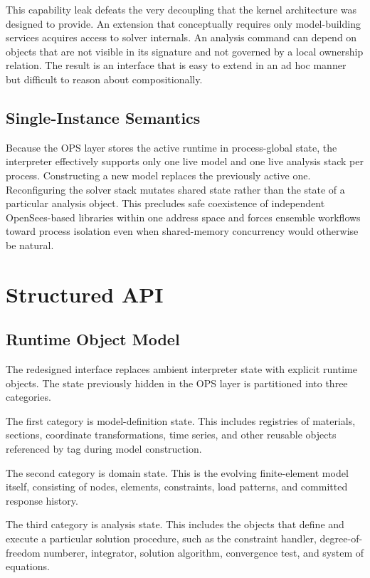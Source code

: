 This capability leak defeats the very decoupling that the kernel
architecture was designed to provide.
An extension that conceptually requires only model-building services
acquires access to solver internals.
An analysis command can depend on objects that are not visible in its
signature and not governed by a local ownership relation.
The result is an interface that is easy to extend in an ad hoc manner
but difficult to reason about compositionally.

\subsection{Single-Instance Semantics}

Because the OPS layer stores the active runtime in process-global state,
the interpreter effectively supports only one live model and one live
analysis stack per process.
Constructing a new model replaces the previously active one.
Reconfiguring the solver stack mutates shared state rather than the state
of a particular analysis object.
This precludes safe coexistence of independent OpenSees-based libraries
within one address space and forces ensemble workflows toward process
isolation even when shared-memory concurrency would otherwise be natural.

\section{Structured API}

\subsection{Runtime Object Model}

The redesigned interface replaces ambient interpreter state with explicit
runtime objects.
The state previously hidden in the OPS layer is partitioned into three
categories.

The first category is model-definition state.
This includes registries of materials, sections, coordinate
transformations, time series, and other reusable objects referenced by
tag during model construction.

The second category is domain state.
This is the evolving finite-element model itself, consisting of nodes,
elements, constraints, load patterns, and committed response history.

The third category is analysis state.
This includes the objects that define and execute a particular solution
procedure, such as the constraint handler, degree-of-freedom numberer,
integrator, solution algorithm, convergence test, and system of
equations.

